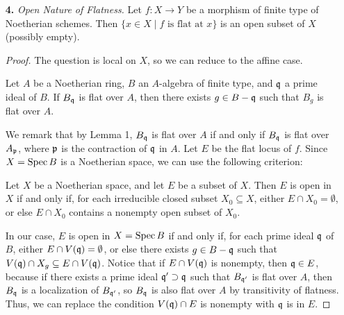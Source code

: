 \documentclass[a4paper]{article}
\begin{document}
\begin{enumerate} [label=\textbf{\arabic*.}, leftmargin=0em]
\begin{proof}
\begin{itemize} [leftmargin=0cm]
            \item[(c)] Let $I = (z^2, zw, w^2, xz - yw)$.
                  It suffices to show $$\sqrt{I} = (z, w).$$
                  The generators of $I$ are also in $(z, w)$, a prime ideal, so we have inclusion in one direction, and the left-hand side contains $z, w$, so we have inclusion in the other direction.
                  Also, $I$ is a $(z, w)$-primary ideal, so it can only have one associated point (A.M., 4.5).
                  Hence, $X$ has no embedded points.
                  Lastly, by the same reasoning in (b), we have
                  \begin{equation*}
                    \dim_k k[x, y, z, w]/(I + Q) = 3, \quad \dim_K K[z, w]/I \leq 2.
                  \end{equation*}
          \end{itemize}
        \end{proof}

  \item[\textbf{4.}] \textit{Open Nature of Flatness.} Let $f : X \to Y$ be a morphism of finite type of Noetherian schemes. Then $\{ x \in X \mid \text{$f$ is flat at $x$} \}$ is an open subset of $X$ (possibly empty).

        \begin{proof}
          The question is local on $X$, so we can reduce to the affine case.
          \begin{lemma}
            Let $A$ be a Noetherian ring, $B$ an $A$-algebra of finite type, and $\mathfrak{q}$ a prime ideal of $B$.
            If $B_{\mathfrak{q}}$ is flat over $A$, then there exists $g \in B - \mathfrak{q}$ such that $B_g$ is flat over $A$.
          \end{lemma}
          We remark that by Lemma 1, $B_{\mathfrak{q}}$ is flat over $A$ if and only if $B_{\mathfrak{q}}$ is flat over $A_{\mathfrak{p}}$, where $\mathfrak{p}$ is the contraction of $\mathfrak{q}$ in $A$.
          Let $E$ be the flat locus of $f$.
          Since $X = \operatorname{Spec}{B}$ is a Noetherian space, we can use the following criterion:
          \begin{lemma} [A.M., Ex. 7.22]
            Let $X$ be a Noetherian space, and let $E$ be a subset of $X$.
            Then $E$ is open in $X$ if and only if, for each irreducible closed subset $X_0 \subseteq X$, either $E \cap X_0 = \emptyset$, or else $E \cap X_0$ contains a nonempty open subset of $X_0$.
          \end{lemma}
          In our case, $E$ is open in $X = \operatorname{Spec}{B}$ if and only if, for each prime ideal $\mathfrak{q}$ of $B$, either $E \cap V(\mathfrak{q}) = \emptyset$, or else there exists $g \in B - \mathfrak{q}$ such that $V(\mathfrak{q}) \cap X_g \subseteq E \cap V(\mathfrak{q})$.
          Notice that if $E \cap V(\mathfrak{q})$ is nonempty, then $\mathfrak{q} \in E$, because if there exists a prime ideal $\mathfrak{q}' \supset \mathfrak{q}$ such that $B_{\mathfrak{q}'}$ is flat over $A$, then $B_{\mathfrak{q}}$ is a localization of $B_{\mathfrak{q}'}$, so $B_{\mathfrak{q}}$ is also flat over $A$ by transitivity of flatness.
          Thus, we can replace the condition $V(\mathfrak{q}) \cap E$ is nonempty with $\mathfrak{q}$ is in $E$.


\end{proof}
\end{enumerate}
\end{document}

